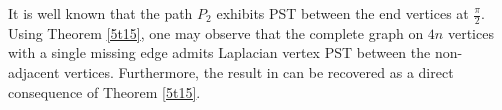 \documentclass[12pt,a4paper]{article}
\newtheorem{thm}{Theorem}
\newtheorem{lem}{Lemma}
\newtheorem{rem}{Remark}
\def \u {{\bf u}}
\def \v {{\bf v}}
\begin{document}
 It is well known that the path $P_2$ exhibits PST between the end vertices at $\frac{\pi}{2}.$ Using Theorem \ref{5t15}, one may observe that the complete graph on $4n$ vertices with a single missing edge admits Laplacian vertex PST between the non-adjacent vertices. Furthermore, the result in \cite[Corollary 1]{pal8} can be recovered as a direct consequence of Theorem \ref{5t15}.

\end{document}

